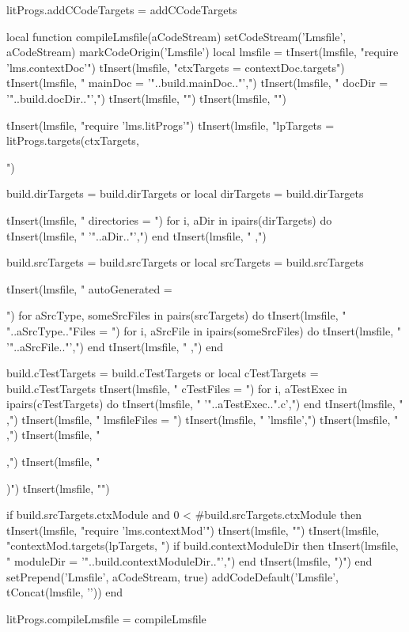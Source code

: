 litProgs.addCCodeTargets = addCCodeTargets
\stopLuaCode

\startMkIVCode
\def\compileLmsfile#1{
  \directlua{
    thirddata.literateProgs.compileLmsfile('#1')
  }
}
\stopMkIVCode

\startLuaCode
local function compileLmsfile(aCodeStream)
  setCodeStream('Lmsfile', aCodeStream)
  markCodeOrigin('Lmsfile')
  local lmsfile = {}
  tInsert(lmsfile, "require 'lms.contextDoc'\n")
  tInsert(lmsfile, "ctxTargets = contextDoc.targets{")
  tInsert(lmsfile, "  mainDoc  = '"..build.mainDoc.."',")
  tInsert(lmsfile, "  docDir    = '"..build.docDir.."',")
  tInsert(lmsfile, "}")
  tInsert(lmsfile, "")
  
  tInsert(lmsfile, "require 'lms.litProgs'\n")
  tInsert(lmsfile, "lpTargets = litProgs.targets(ctxTargets, {")
  
  build.dirTargets = build.dirTargets or { }
  local dirTargets = build.dirTargets
  
  tInsert(lmsfile, "  directories = {")
  for i, aDir in ipairs(dirTargets) do
    tInsert(lmsfile, "    '"..aDir.."',")
  end
  tInsert(lmsfile, "  },")
  
  build.srcTargets = build.srcTargets or { }
  local srcTargets = build.srcTargets
  
  tInsert(lmsfile, "  autoGenerated = {")
  for aSrcType, someSrcFiles in pairs(srcTargets) do
    tInsert(lmsfile, "    "..aSrcType.."Files = {")
    for i, aSrcFile in ipairs(someSrcFiles) do
      tInsert(lmsfile, "      '"..aSrcFile.."',")
    end
    tInsert(lmsfile, "    },")
  end
  
  build.cTestTargets = build.cTestTargets or { }
  local cTestTargets = build.cTestTargets
  tInsert(lmsfile, "    cTestFiles = {")
  for i, aTestExec in ipairs(cTestTargets) do
    tInsert(lmsfile, "      '"..aTestExec..".c',")
  end
  tInsert(lmsfile, "    },")
  tInsert(lmsfile, "    lmsfileFiles = {")
  tInsert(lmsfile, "      'lmsfile',")
  tInsert(lmsfile, "    },")
  tInsert(lmsfile, "  },")
  tInsert(lmsfile, "})")
  tInsert(lmsfile, "")
    
  if build.srcTargets.ctxModule and 0 < #build.srcTargets.ctxModule then
    tInsert(lmsfile, "require 'lms.contextMod'")
    tInsert(lmsfile, "")
    tInsert(lmsfile, "contextMod.targets(lpTargets, {")
      if build.contextModuleDir then
        tInsert(lmsfile, "  moduleDir = '"..build.contextModuleDir.."',")
      end
    tInsert(lmsfile, "})")
  end
  setPrepend('Lmsfile', aCodeStream, true)
  addCodeDefault('Lmsfile', tConcat(lmsfile, '\n'))
end

litProgs.compileLmsfile = compileLmsfile
\stopLuaCode

\stopchapter
